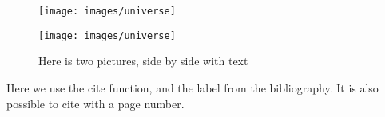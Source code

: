\documentclass[a4paper,11pt,danish,oneside]{article}
\begin{document}
\begin{figure}[h]
	\begin{center}
		\begin{minipage}{0.45\textwidth}
			\centering
			\texttt{[image: images/universe]}
		\end{minipage}
		\begin{minipage}{0.45\textwidth}
			\centering
			\texttt{[image: images/universe]}
		\end{minipage}
		\caption{Here is two pictures, side by side with text}
	\end{center}
\end{figure}

\cite{Label}
Here we use the cite function, and the label from the bibliography. 
\cite[p.666]{Label}
It is also possible to cite with a page number.
\end{document}
